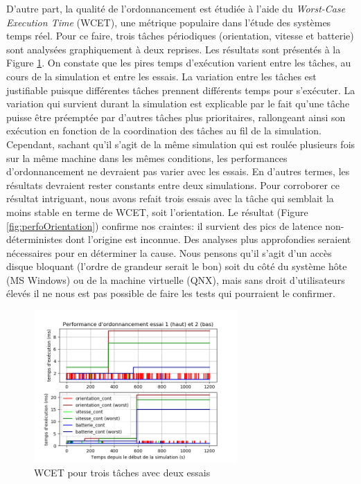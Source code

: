 \documentclass[journal]{IEEEtran}
\begin{document}
D'autre part, la qualité de l'ordonnancement est étudiée à l'aide du \textit{Worst-Case Execution Time} (WCET), une métrique populaire dans l'étude des systèmes temps réel. Pour ce faire, trois tâches périodiques (orientation, vitesse et batterie) sont analysées graphiquement à deux reprises. Les résultats sont présentés à la Figure \ref{fig:perfoTrois}. On constate que les pires temps d'exécution varient entre les tâches, au cours de la simulation et entre les essais. La variation entre les tâches est justifiable puisque différentes tâches prennent différents temps pour s'exécuter. La variation qui survient durant la simulation est explicable par le fait qu'une tâche puisse être préemptée par d'autres tâches plus prioritaires, rallongeant ainsi son exécution en fonction de la coordination des tâches au fil de la simulation. Cependant, sachant qu'il s'agit de la même simulation qui est roulée plusieurs fois sur la même machine dans les mêmes conditions, les performances d'ordonnancement ne devraient pas varier avec les essais. En d'autres termes, les résultats devraient rester constants entre deux simulations. Pour corroborer ce résultat intriguant, nous avons refait trois essais avec la tâche qui semblait la moins stable en terme de WCET, soit l'orientation. Le résultat (Figure \ref{fig:perfoOrientation}) confirme nos craintes: il survient des pics de latence non-déterministes dont l'origine est inconnue. Des analyses plus approfondies seraient nécessaires pour en déterminer la cause. Nous pensons qu'il s'agit d'un accès disque bloquant (l'ordre de grandeur serait le bon) soit du côté du système hôte (MS Windows) ou de la machine virtuelle (QNX), mais sans droit d'utilisateurs élevés il ne nous est pas possible de faire les tests qui pourraient le confirmer.

\begin{figure}
	\centering
	\captionsetup{justification=centering}
	\includegraphics[width=220pt]{csv_try_1_2.png}
	\caption{WCET pour trois tâches avec deux essais}
	\label{fig:perfoTrois}
\end{figure}
\end{document}
